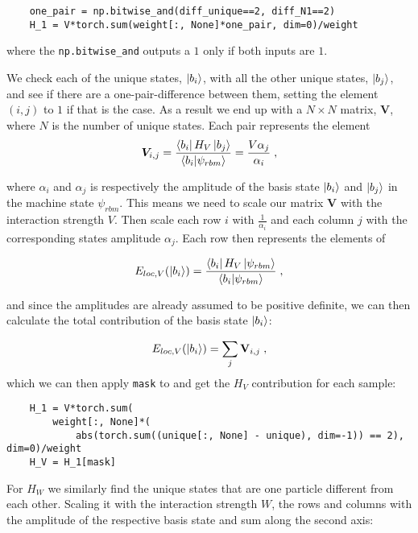 \begin{verbatim} 
    one_pair = np.bitwise_and(diff_unique==2, diff_N1==2)
    H_1 = V*torch.sum(weight[:, None]*one_pair, dim=0)/weight
\end{verbatim}

where the \texttt{np.bitwise_and} outputs a $1$ only if both inputs are $1$. 

We check each of the unique states, $\ket{b_i}$, with all the other unique states, $\ket{b_j}$, and see if there are a one-pair-difference between them, setting the element $\left (i, j \right )$ to $1$ if that is the case. As a result we end up with a $N\times N$ matrix, $\mathbf{V}$, where $N$ is the number of unique states. Each pair represents the element
\begin{equation}
  \boldsymbol{V}_{i,j} =\frac{\bra{b_i}H_V\ket{b_j}}{\braket{b_i}{\psi_{rbm}}} = \frac{V\alpha_j}{\alpha_i} \; ,
  \label{eq:LMG_imp_V_cont}
\end{equation}

where $\alpha_i$ and $\alpha_j$ is respectively the amplitude of the basis state $\ket{b_i}$ and $\ket{b_j}$ in the machine state $\psi_{rbm}$. This means we need to scale our matrix $\mathbf{V}$ with the interaction strength $V$. Then scale each row $i$ with $\frac{1}{\alpha_i}$ and each column $j$ with the corresponding states amplitude $\alpha_j$. Each row then represents the elements of 

$$ E_{loc, V}(\ket{b_i}) = \frac{\bra{b_i}H_V\ket{\psi_{rbm}}}{\braket{b_i}{\psi_{rbm}}} \; , $$

and since the amplitudes are already assumed to be positive definite, we can then calculate the total contribution of the basis state $\ket{b_i}$:

\begin{equation}
 E_{loc, V}(\ket{b_i})= \sum_j \mathbf{V}_{i,j} \; ,
\end{equation}
which we can then apply \texttt{mask} to and get the $H_V$ contribution for each sample:

\begin{verbatim}
    H_1 = V*torch.sum(
        weight[:, None]*(
            abs(torch.sum((unique[:, None] - unique), dim=-1)) == 2), dim=0)/weight
    H_V = H_1[mask]
\end{verbatim}

For $H_W$ we similarly find the unique states that are one particle different from each other. Scaling it with the interaction strength $W$, the rows and columns with the amplitude of the respective basis state and sum along the second axis:

